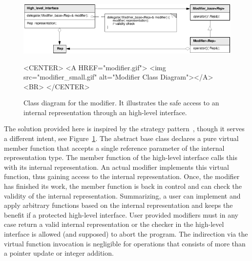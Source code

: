 \begin{figure}
\begin{ccTexOnly}
    \begin{center}
      \parbox{\textwidth}{%
          \includegraphics[width=\textwidth]{Modifier/idraw/modifier}%
      }
    \end{center}
\end{ccTexOnly}

    \caption{Class diagram for the modifier. It illustrates the
             safe access to an internal representation through an
             high-level interface.
    \label{figureModifierDesign}}

\begin{ccHtmlOnly}
    <CENTER>
    <A HREF="modifier.gif">
        <img src="modifier_small.gif" alt="Modifier Class Diagram"></A><BR>
    </CENTER>
\end{ccHtmlOnly}
\end{figure}

The solution provided here is inspired by the strategy
pattern~\cite{cgal:ghjv-dpero-95}, though it serves a different intent, see
Figure~\ref{figureModifierDesign}.  The abstract base class
 declares a pure virtual member function
 that accepts a single reference parameter of the
internal representation type. The member function  of
the high-level interface calls this  with its internal
representation.  An actual modifier implements this virtual function,
thus gaining access to the internal representation. Once, the modifier
has finished its work, the member function  is back in
control and can check the validity of the internal representation.
Summarizing, a user can implement and apply arbitrary functions based
on the internal representation and keeps the benefit if a protected
high-level interface. User provided modifiers must in any case return
a valid internal representation or the checker in the high-level
interface is allowed (and supposed) to abort the program. The
indirection via the virtual function invocation is negligible for
operations that consists of more than a pointer update or integer
addition.



